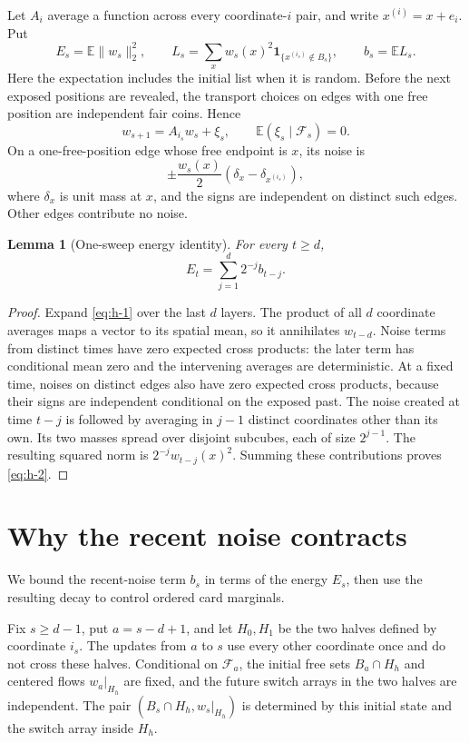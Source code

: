\documentclass[11pt]{article}
\newtheorem{lemma}[theorem]{Lemma}
\theoremstyle{remark}
\numberwithin{equation}{section}
\begin{document}
Let \(A_i\) average a function across every coordinate-\(i\) pair, and write \(x^{(i)}=x+e_i\). Put
\[
 E_s=\mathbb E\|w_s\|_2^2,
 \qquad
 L_s=\sum_x w_s(x)^2\mathbf1_{\{x^{(i_s)}\notin B_s\}},
 \qquad b_s=\mathbb E L_s.
\]
Here the expectation includes the initial list when it is random. Before the next exposed positions are revealed, the transport choices on edges with one free position are independent fair coins. Hence
\begin{equation}\label{eq:h-1}
 w_{s+1}=A_{i_s}w_s+\xi_s,
 \qquad \mathbb E(\xi_s\mid\mathcal F_s)=0.
\end{equation}
On a one-free-position edge whose free endpoint is \(x\), its noise is
\[
 \pm\frac{w_s(x)}2(\delta_x-\delta_{x^{(i_s)}}),
\]
where $\delta_x$ is unit mass at $x$, and the signs are independent on distinct such edges. Other edges contribute no noise.

\begin{lemma}[One-sweep energy identity]\label{lem:energy-memory}
For every \(t\ge d\),
\begin{equation}\label{eq:h-2}
 E_t=\sum_{j=1}^d2^{-j}b_{t-j}.
\end{equation}
\end{lemma}
\begin{proof}
Expand \eqref{eq:h-1} over the last \(d\) layers. The product of all \(d\) coordinate averages maps a vector to its spatial mean, so it annihilates \(w_{t-d}\). Noise terms from distinct times have zero expected cross products: the later term has conditional mean zero and the intervening averages are deterministic. At a fixed time, noises on distinct edges also have zero expected cross products, because their signs are independent conditional on the exposed past. The noise created at time \(t-j\) is followed by averaging in \(j-1\) distinct coordinates other than its own. Its two masses spread over disjoint subcubes, each of size \(2^{j-1}\). The resulting squared norm is \(2^{-j}w_{t-j}(x)^2\). Summing these contributions proves \eqref{eq:h-2}.
\end{proof}

\section{Why the recent noise contracts}\label{sec:contraction}

We bound the recent-noise term \(b_s\) in terms of the energy \(E_s\), then use the resulting decay to control ordered card marginals.

Fix \(s\ge d-1\), put \(a=s-d+1\), and let \(H_0,H_1\) be the two halves defined by coordinate \(i_s\). The updates from \(a\) to \(s\) use every other coordinate once and do not cross these halves. Conditional on \(\mathcal F_a\), the initial free sets \(B_a\cap H_h\) and centered flows \(w_a|_{H_h}\) are fixed, and the future switch arrays in the two halves are independent. The pair \((B_s\cap H_h,w_s|_{H_h})\) is determined by this initial state and the switch array inside \(H_h\).
\end{document}
